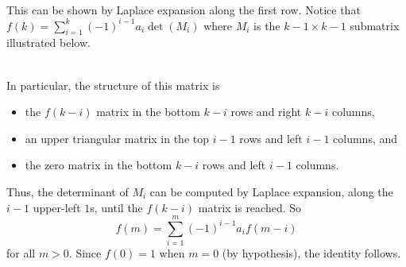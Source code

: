 \documentclass{article}
\newenvironment{solution}[1][Solution.]{\begin{trivlist}
\item[\hskip \labelsep {\bfseries #1}]}{\end{trivlist}}
\begin{document}
\begin{solution}
\begin{align*}
  \end{align*}
  This can be shown by Laplace expansion along the first row.
  Notice that $f(k) = \sum_{i=1}^k (-1)^{i-1} a_i \det(M_i)$ where $M_i$ is the
  $k-1 \times k-1$ submatrix illustrated below.
  \\
  \\
  In particular, the structure of this matrix is \begin{itemize}
    \item the $f(k-i)$ matrix in the bottom $k-i$ rows and right $k-i$ columns,
    \item an upper triangular matrix in the top $i-1$ rows and left $i - 1$ columns, and
    \item the zero matrix in the bottom $k-i$ rows and left $i-1$ columns.
  \end{itemize}
  Thus, the determinant of $M_i$ can be computed by Laplace expansion, along
  the $i-1$ upper-left $1$s, until the $f(k-i)$ matrix is reached.
  So \[
    f(m) = \sum_{i=1}^m (-1)^{i-1} a_i f(m-i)
  \] for all $m > 0$. Since $f(0) = 1$ when $m = 0$ (by hypothesis), the identity follows.
\end{solution}
\end{document}
